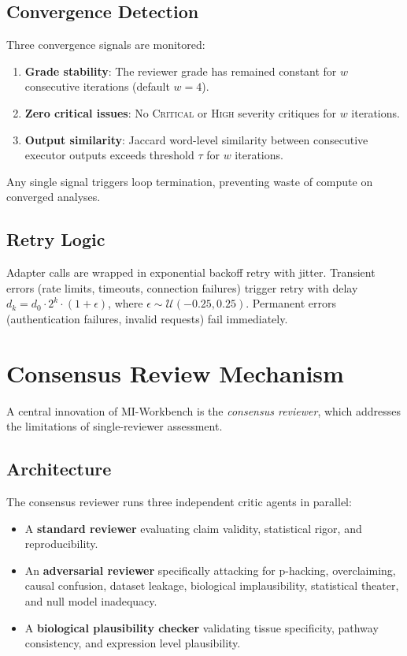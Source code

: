 \documentclass[11pt,a4paper]{article}
\begin{document}
\subsection{Convergence Detection}
Three convergence signals are monitored:
\begin{enumerate}[leftmargin=*]
  \item \textbf{Grade stability}: The reviewer grade has remained constant for $w$ consecutive iterations (default $w{=}4$).
  \item \textbf{Zero critical issues}: No \textsc{Critical} or \textsc{High} severity critiques for $w$ iterations.
  \item \textbf{Output similarity}: Jaccard word-level similarity between consecutive executor outputs exceeds threshold $\tau$ for $w$ iterations.
\end{enumerate}
Any single signal triggers loop termination, preventing waste of compute on converged analyses.

\subsection{Retry Logic}
Adapter calls are wrapped in exponential backoff retry with jitter.
Transient errors (rate limits, timeouts, connection failures) trigger retry with delay $d_k = d_0 \cdot 2^k \cdot (1 + \epsilon)$, where $\epsilon \sim \mathcal{U}(-0.25, 0.25)$.
Permanent errors (authentication failures, invalid requests) fail immediately.


\section{Consensus Review Mechanism}
\label{sec:consensus}

A central innovation of MI-Workbench is the \emph{consensus reviewer}, which addresses the limitations of single-reviewer assessment.

\subsection{Architecture}
The consensus reviewer runs three independent critic agents in parallel:
\begin{itemize}[leftmargin=*]
  \item A \textbf{standard reviewer} evaluating claim validity, statistical rigor, and reproducibility.
  \item An \textbf{adversarial reviewer} specifically attacking for p-hacking, overclaiming, causal confusion, dataset leakage, biological implausibility, statistical theater, and null model inadequacy.
  \item A \textbf{biological plausibility checker} validating tissue specificity, pathway consistency, and expression level plausibility.
\end{itemize}
\end{document}
